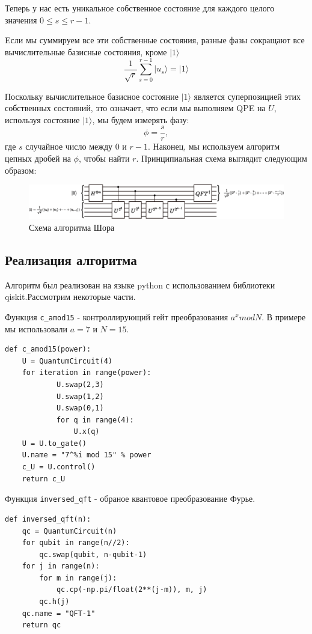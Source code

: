\documentclass[14pt]{article}
\begin{document}
	Теперь у нас есть уникальное собственное состояние для каждого целого значения $0 \le s 
	\le r - 1$.
	
	Eсли мы суммируем все эти собственные состояния, разные фазы сокращают все вычислительные базисные состояния, кроме $|1 \rangle$
	\begin{equation}
		 \frac{1}{\sqrt{r}} \sum_{s=0}^{r-1} |u_s \rangle  = |1 \rangle
	\end{equation}
	
	Поскольку вычислительное базисное состояние $|1 \rangle$ является суперпозицией этих собственных состояний, это означает, что если мы выполняем QPE на $U$, используя состояние $|1\rangle$, мы будем измерять фазу:
	\begin{equation}
		 \phi = \frac{s}{r},
	\end{equation}
	где $s$ случайное число между 0 и $r - 1$. Наконец, мы используем алгоритм цепных дробей на $\phi$, чтобы найти $r$. Принципиальная схема выглядит следующим образом:
	\begin{figure}[h!]
		\centering
		\includegraphics[scale=0.5]{shor_circuit_1}
		\caption{Схема алгоритма Шора}
	\end{figure}

	
	\newpage
	\subsection{Реализация алгоритма}
	
	Алгоритм был реализован на языке python с использованием библиотеки qiskit.Рассмотрим некоторые части. 
	
			
	Функция \verb|c_amod15| - контроллирующий гейт преобразования $a^x mod N$. В примере мы использовали $a=7$ и $N=15$.
	
	\begin{verbatim}
def c_amod15(power):
    U = QuantumCircuit(4)
    for iteration in range(power):
            U.swap(2,3)
            U.swap(1,2)
            U.swap(0,1)
            for q in range(4):
                U.x(q)
    U = U.to_gate()
    U.name = "7^%i mod 15" % power
    c_U = U.control()
    return c_U
	\end{verbatim}
	
	Функция \verb|inversed_qft| - обраное квантовое преобразование Фурье.
	\begin{verbatim}
def inversed_qft(n):
    qc = QuantumCircuit(n)
    for qubit in range(n//2):
        qc.swap(qubit, n-qubit-1)
    for j in range(n):
        for m in range(j):
            qc.cp(-np.pi/float(2**(j-m)), m, j)
        qc.h(j)
    qc.name = "QFT-1"
    return qc
	\end{verbatim}
	
\end{document}
